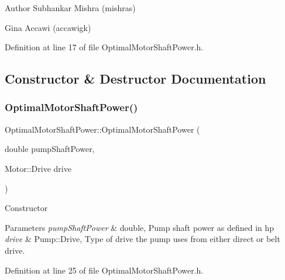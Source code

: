 \begin{DoxyAuthor}{Author}
Subhankar Mishra (mishras) 

Gina Accawi (accawigk) 
\end{DoxyAuthor}


Definition at line 17 of file Optimal\+Motor\+Shaft\+Power.\+h.



\subsection{Constructor \& Destructor Documentation}
\mbox{\label{class_optimal_motor_shaft_power_af0981673204c5f8a8cae26a8be8a8a5c}} 
\subsubsection{\texorpdfstring{Optimal\+Motor\+Shaft\+Power()}{OptimalMotorShaftPower()}\hspace{0.1cm}{\footnotesize\ttfamily [1/3]}}
{\footnotesize\ttfamily Optimal\+Motor\+Shaft\+Power\+::\+Optimal\+Motor\+Shaft\+Power (\begin{DoxyParamCaption}\item[{double}]{pump\+Shaft\+Power,  }\item[{Motor\+::\+Drive}]{drive }\end{DoxyParamCaption})\hspace{0.3cm}{\ttfamily [inline]}}

Constructor 
\begin{DoxyParams}{Parameters}
{\em pump\+Shaft\+Power} & double, Pump shaft power as defined in hp \\
\hline
{\em drive} & Pump\+::\+Drive, Type of drive the pump uses from either direct or belt drive. \\
\hline
\end{DoxyParams}


Definition at line 25 of file Optimal\+Motor\+Shaft\+Power.\+h.

\mbox{\label{class_optimal_motor_shaft_power_af0981673204c5f8a8cae26a8be8a8a5c}} 
